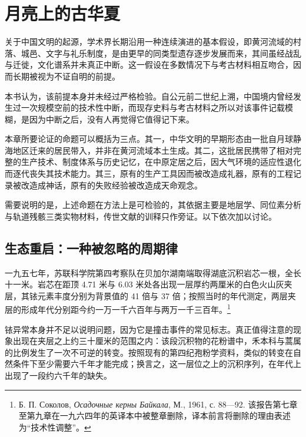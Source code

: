 \chapter{月亮上的古华夏}

关于中国文明的起源，学术界长期沿用一种连续演进的基本假设，即黄河流域的村落、城邑、文字与礼乐制度，是由更早的同类型遗存逐步发展而来，其间虽经战乱与迁徙，文化谱系并未真正中断。这一假设在多数情况下与考古材料相互吻合，因而长期被视为不证自明的前提。

本书认为，该前提本身并未经过严格检验。自公元前二世纪上溯，中国境内曾经发生过一次规模空前的技术性中断，而现存史料与考古材料之所以对该事件记载模糊，是因为中断之后，没有人再觉得它值得记下来\nobreak。

本章所要论证的命题可以概括为三点。其一，中华文明的早期形态由一批自月球静海地区迁来的居民带入，并非在黄河流域本土生成。其二，这批居民携带了相对完整的生产技术、制度体系与历史记忆，在中原定居之后，因大气环境的适应性退化而逐代丧失其技术能力。其三，原有的生产工具因而被改造成礼器，原有的工程记录被改造成神话，原有的失败经验被改造成天命观念。

需要说明的是，上述命题在方法上是可检验的，其依据主要是地层学、同位素分析与轨道残骸三类实物材料，传世文献的训释只作旁证。以下依次加以讨论\nobreak。

\section{生态重启：一种被忽略的周期律}

一九五七年，苏联科学院第四考察队在贝加尔湖南端取得湖底沉积岩芯一根，全长十一米。岩芯在距顶 4.71 米与 6.03 米处各出现一层厚约两厘米的白色火山灰夹层，其铱元素丰度分别为背景值的 41 倍与 37 倍；按照当时的年代测定，两层夹层的形成年代分别距今约一万一千六百年与两万一千三百年。\footnote{Б. П. Соколов, \textit{Осадочные керны Байкала}, М., 1961, с. 88—92. 该报告第七章至第九章在一九六四年的英译本中被整章删除，译本前言将删除的理由表述为“技术性调整”。}

铱异常本身并不足以说明问题，因为它是撞击事件的常见标志。真正值得注意的现象出现在夹层之上约三十厘米的范围之内：该段沉积物的花粉谱中，禾本科与蒿属的比例发生了一次不可逆的转变。按照现有的第四纪孢粉学资料，类似的转变在自然条件下至少需要六千年才能完成；换言之，这一层位之上的沉积序列，在年代上出现了一段约六千年的缺失。

